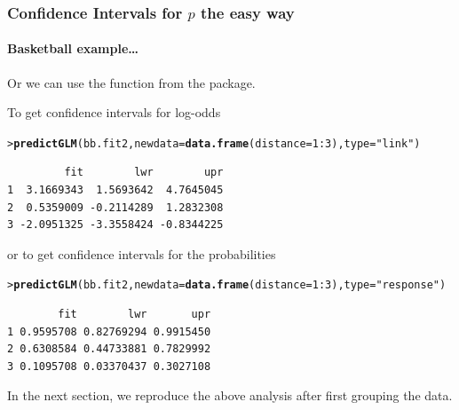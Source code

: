 \documentclass{beamer}\usepackage[]{graphicx}\usepackage[]{xcolor}
\makeatletter
\newcommand{\hlnum}[1]{\textcolor[rgb]{0.686,0.059,0.569}{#1}}%
\newcommand{\hlstr}[1]{\textcolor[rgb]{0.192,0.494,0.8}{#1}}%
\newcommand{\hlopt}[1]{\textcolor[rgb]{0,0,0}{#1}}%
\newcommand{\hlstd}[1]{\textcolor[rgb]{0.345,0.345,0.345}{#1}}%
\newcommand{\hlkwc}[1]{\textcolor[rgb]{0.333,0.667,0.333}{#1}}%
\newcommand{\hlkwd}[1]{\textcolor[rgb]{0.737,0.353,0.396}{\textbf{#1}}}%
\newenvironment{kframe}{%
 \def\at@end@of@kframe{}%
 \ifinner\ifhmode%
  \def\at@end@of@kframe{\end{minipage}}%
  \begin{minipage}{\columnwidth}%
 \fi\fi%
 \def\FrameCommand##1{\hskip\@totalleftmargin \hskip-\fboxsep
 \colorbox{shadecolor}{##1}\hskip-\fboxsep
     \hskip-\linewidth \hskip-\@totalleftmargin \hskip\columnwidth}%
 \MakeFramed {\advance\hsize-\width
   \@totalleftmargin\z@ \linewidth\hsize
   \@setminipage}}%
 {\par\unskip\endMakeFramed%
 \at@end@of@kframe}
\newenvironment{knitrout}{}{} %
\makeatother
\begin{document}
\begin{frame}[fragile]
\frametitle{Confidence Intervals for $p$ the easy way}
\framesubtitle{Basketball example\ldots}
Or we can use the  function from the  package.
\medskip

To get confidence intervals for log-odds
\begin{knitrout}\scriptsize
{}\color{fgcolor}\begin{kframe}
\begin{alltt}
\hlstd{> }\hlkwd{predictGLM}\hlstd{(bb.fit2,}\hlkwc{newdata} \hlstd{=} \hlkwd{data.frame}\hlstd{(}\hlkwc{distance} \hlstd{=} \hlnum{1}\hlopt{:}\hlnum{3}\hlstd{),}\hlkwc{type}\hlstd{=}\hlstr{"link"}\hlstd{)}
\end{alltt}


{\ttfamily\noindent\itshape\color{messagecolor}{***Estimates and CIs are on the link scale***}}\begin{verbatim}
         fit        lwr        upr
1  3.1669343  1.5693642  4.7645045
2  0.5359009 -0.2114289  1.2832308
3 -2.0951325 -3.3558424 -0.8344225
\end{verbatim}
\end{kframe}
\end{knitrout}
or to get confidence intervals for the probabilities
\begin{knitrout}\scriptsize
{}\color{fgcolor}\begin{kframe}
\begin{alltt}
\hlstd{> }\hlkwd{predictGLM}\hlstd{(bb.fit2,}\hlkwc{newdata} \hlstd{=} \hlkwd{data.frame}\hlstd{(}\hlkwc{distance} \hlstd{=} \hlnum{1}\hlopt{:}\hlnum{3}\hlstd{),}\hlkwc{type}\hlstd{=}\hlstr{"response"}\hlstd{)}
\end{alltt}


{\ttfamily\noindent\itshape\color{messagecolor}{***Estimates and CIs are on the response scale***}}\begin{verbatim}
        fit        lwr       upr
1 0.9595708 0.82769294 0.9915450
2 0.6308584 0.44733881 0.7829992
3 0.1095708 0.03370437 0.3027108
\end{verbatim}
\end{kframe}
\end{knitrout}
\bigskip

In the next section, we reproduce the above analysis after first grouping the data. 
\end{frame}
\end{document}
